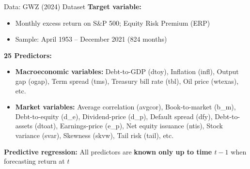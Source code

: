 \documentclass[10pt]{beamer}
\newcommand{\highlight}[1]{\textcolor{AccentOrange}{\textbf{#1}}}
\begin{document}
\begin{frame}{Data: GWZ (2024) Dataset}
  \textbf{Target variable:}
  \begin{itemize}
    \item Monthly excess return on S\&P 500; Equity Risk Premium (ERP)
    \item Sample: April 1953 -- December 2021 (824 months)
  \end{itemize}
  
  \vspace{1em}
  \textbf{25 Predictors:}
    \begin{itemize}
    \item \textbf{Macroeconomic variables:} Debt-to-GDP (dtoy), Inflation (infl), Output gap (ogap), Term spread (tms), Treasury bill rate (tbl), Oil price (wtexas), etc. 
    \item \textbf{Market variables:} Average correlation (avgcor), Book-to-market (b\_m), Debt-to-equity (d\_e), Dividend-price (d\_p), Default spread (dfy), Debt-to-assets (dtoat), Earnings-price (e\_p), Net equity issuance (ntis), Stock variance (svar), Skewness (skvw), Tail risk (tail), etc. 
    \end{itemize}
   
  
  \vspace{1em}
  \textbf{Predictive regression:} All predictors are \highlight{known only up to time $t-1$} when forecasting return at $t$
\end{frame}
\end{document}
